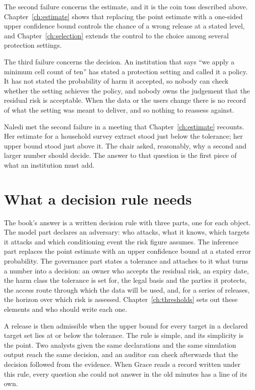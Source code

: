 The second failure concerns the estimate, and it is the coin toss described above.
Chapter~\ref{ch:estimate} shows that replacing the point estimate with a one-sided upper
confidence bound controls the chance of a wrong release at a stated level, and
Chapter~\ref{ch:selection} extends the control to the choice among several protection
settings.

The third failure concerns the decision. An institution that says ``we apply a minimum
cell count of ten'' has stated a protection setting and called it a policy. It has not
stated the probability of harm it accepted, so nobody can check whether the setting
achieves the policy, and nobody owns the judgement that the residual risk is acceptable.
When the data or the users change there is no record of what the setting was meant to
deliver, and so nothing to reassess against.

Naledi met the second failure in a meeting that Chapter~\ref{ch:estimate} recounts. Her
estimate for a household survey extract stood just below the tolerance; her upper bound
stood just above it. The chair asked, reasonably, why a second and larger number should
decide. The answer to that question is the first piece of what an institution must add.

\section{What a decision rule needs}

The book's answer is a written decision rule with three parts, one for each object. The
model part declares an adversary: who attacks, what it knows, which targets it attacks and
which conditioning event the risk figure assumes. The inference part replaces the point
estimate with an upper confidence bound at a stated error probability. The governance part
states a tolerance and attaches to it what turns a number into a decision: an owner who
accepts the residual risk, an expiry date, the harm class the tolerance is set for, the
legal basis and the parties it protects, the access route through which the data will be
used, and, for a series of releases, the horizon over which risk is assessed.
Chapter~\ref{ch:thresholds} sets out these elements and who should write each one.

A release is then admissible when the upper bound for every target in a declared target set
lies at or below the tolerance. The rule is simple, and its simplicity is the point. Two
analysts given the same declarations and the same simulation output reach the same
decision, and an auditor can check afterwards that the decision followed from the evidence.
When Grace reads a record written under this rule, every question she could not answer in
the old minutes has a line of its own.

